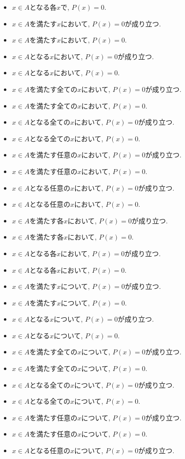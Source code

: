 \documentclass[a4paper,12pt,draft]{amsart}
\newcommand{\PPP}[1]{P(#1)=0}
\begin{document}
\begin{itemize}
\item $x\in A$となる各$x$で, $\PPP{x}$.
\item $x\in A$を満たす$x$において, $\PPP{x}$が成り立つ.
\item $x\in A$を満たす$x$において, $\PPP{x}$.
\item $x\in A$となる$x$において, $\PPP{x}$が成り立つ.
\item $x\in A$となる$x$において, $\PPP{x}$.
\item $x\in A$を満たす全ての$x$において, $\PPP{x}$が成り立つ.
\item $x\in A$を満たす全ての$x$において, $\PPP{x}$.
\item $x\in A$となる全ての$x$において, $\PPP{x}$が成り立つ.
\item $x\in A$となる全ての$x$において, $\PPP{x}$.
\item $x\in A$を満たす任意の$x$において, $\PPP{x}$が成り立つ.
\item $x\in A$を満たす任意の$x$において, $\PPP{x}$.
\item $x\in A$となる任意の$x$において, $\PPP{x}$が成り立つ.
\item $x\in A$となる任意の$x$において, $\PPP{x}$.
\item $x\in A$を満たす各$x$において, $\PPP{x}$が成り立つ.
\item $x\in A$を満たす各$x$において, $\PPP{x}$.
\item $x\in A$となる各$x$において, $\PPP{x}$が成り立つ.
\item $x\in A$となる各$x$において, $\PPP{x}$.
\item $x\in A$を満たす$x$について, $\PPP{x}$が成り立つ.
\item $x\in A$を満たす$x$について, $\PPP{x}$.
\item $x\in A$となる$x$について, $\PPP{x}$が成り立つ.
\item $x\in A$となる$x$について, $\PPP{x}$.
\item $x\in A$を満たす全ての$x$について, $\PPP{x}$が成り立つ.
\item $x\in A$を満たす全ての$x$について, $\PPP{x}$.
\item $x\in A$となる全ての$x$について, $\PPP{x}$が成り立つ.
\item $x\in A$となる全ての$x$について, $\PPP{x}$.
\item $x\in A$を満たす任意の$x$について, $\PPP{x}$が成り立つ.
\item $x\in A$を満たす任意の$x$について, $\PPP{x}$.
\item $x\in A$となる任意の$x$について, $\PPP{x}$が成り立つ.

\end{itemize}
\end{document}
